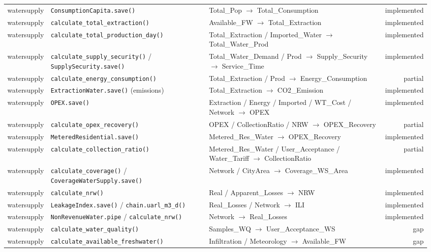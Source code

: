 \documentclass[11pt]{article}
\newcommand{\code}[1]{\texttt{#1}}
\newcommand{\statusdone}{\textcolor{green!50!black}{implemented}}
\newcommand{\statuspartial}{\textcolor{orange!80!black}{partial}}
\newcommand{\statusgap}{\textcolor{red!70!black}{gap}}
\begin{document}
\begin{xltabular}{\linewidth}{l X X r}
watersupply & \code{ConsumptionCapita.save()} & Total\_Pop $\to$ Total\_Consumption & \statusdone{} \\
watersupply & \code{calculate\_total\_extraction()} & Available\_FW $\to$ Total\_Extraction & \statusdone{} \\
watersupply & \code{calculate\_total\_production\_day()} & Total\_Extraction / Imported\_Water $\to$ Total\_Water\_Prod & \statusdone{} \\
watersupply & \code{calculate\_supply\_security()} / \code{SupplySecurity.save()} & Total\_Water\_Demand / Prod $\to$ Supply\_Security $\to$ Service\_Time & \statusdone{} \\
watersupply & \code{calculate\_energy\_consumption()} & Total\_Extraction / Prod $\to$ Energy\_Consumption & \statuspartial{} \\
watersupply & \code{ExtractionWater.save()} (emissions) & Total\_Extraction $\to$ CO2\_Emission & \statusdone{} \\
watersupply & \code{OPEX.save()} & Extraction / Energy / Imported / WT\_Cost / Network $\to$ OPEX & \statusdone{} \\
watersupply & \code{calculate\_opex\_recovery()} & OPEX / CollectionRatio / NRW $\to$ OPEX\_Recovery & \statuspartial{} \\
watersupply & \code{MeteredResidential.save()} & Metered\_Res\_Water $\to$ OPEX\_Recovery & \statusdone{} \\
watersupply & \code{calculate\_collection\_ratio()} & Metered\_Res\_Water / User\_Acceptance / Water\_Tariff $\to$ CollectionRatio & \statuspartial{} \\
watersupply & \code{calculate\_coverage()} / \code{CoverageWaterSupply.save()} & Network / CityArea $\to$ Coverage\_WS\_Area & \statusdone{} \\
watersupply & \code{calculate\_nrw()} & Real / Apparent\_Losses $\to$ NRW & \statusdone{} \\
watersupply & \code{LeakageIndex.save()} / \code{chain.uarl\_m3\_d()} & Real\_Losses / Network $\to$ ILI & \statusdone{} \\
watersupply & \code{NonRevenueWater.pipe} / \code{calculate\_nrw()} & Network $\to$ Real\_Losses & \statusdone{} \\
watersupply & \code{calculate\_water\_quality()} & Samples\_WQ $\to$ User\_Acceptance\_WS & \statusgap{} \\
watersupply & \code{calculate\_available\_freshwater()} & Infiltration / Meteorology $\to$ Available\_FW & \statusgap{} \\

\end{xltabular}
\end{document}
